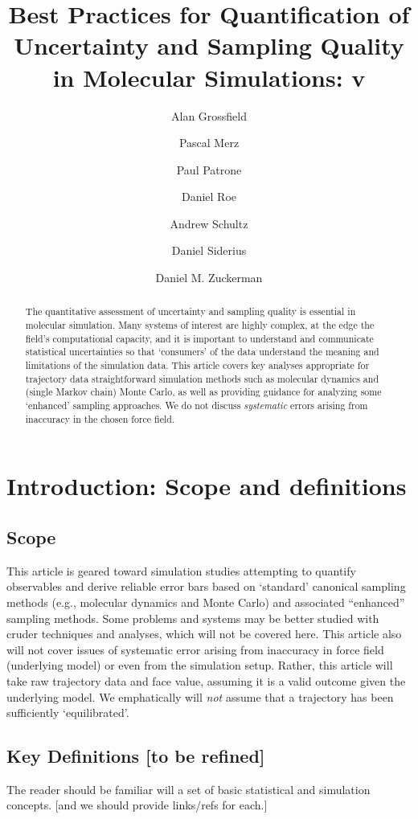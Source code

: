 \documentclass[9pt]{livecoms}
\title{Best Practices for Quantification of Uncertainty and Sampling Quality in Molecular Simulations: v\versionnumber}
\author[1*\authfn{1}]{Alan Grossfield}
\author[2*\authfn{1}]{Pascal Merz}
\author[3*\authfn{1}]{Paul Patrone}
\author[4*\authfn{1}]{Daniel Roe}
\author[5*\authfn{1}]{Andrew Schultz}
\author[6*\authfn{1}]{Daniel Siderius}
\author[7*\authfn{1}]{Daniel M. Zuckerman}
\affil[1]{Institution 1}
\affil[7]{Oregon Health \& Science University}
\begin{document}
\maketitle

\begin{abstract}
The quantitative assessment of uncertainty and sampling quality is essential in molecular simulation.
Many systems of interest are highly complex, at the edge the field's computational capacity, and it is important to understand and communicate statistical uncertainties so that `consumers' of the data understand the meaning and limitations of the simulation data.
This article covers key analyses appropriate for trajectory data straightforward simulation methods such as molecular dynamics and (single Markov chain) Monte Carlo, as well as providing guidance for analyzing some `enhanced' sampling approaches.
We do not discuss \emph{systematic} errors arising from inaccuracy in the chosen force field.
\end{abstract}

\section{Introduction: Scope and definitions}

\subsection{Scope}
This article is geared toward simulation studies attempting to quantify observables and derive reliable error bars based on `standard' canonical sampling methods (e.g., molecular dynamics and Monte Carlo) and associated “enhanced” sampling methods.  
Some problems and systems may be better studied with cruder techniques and analyses, which will not be covered here.
This article also will not cover issues of systematic error arising from inaccuracy in force field (underlying model) or even from the simulation setup.
Rather, this article will take raw trajectory data and face value, assuming it is a valid outcome given the underlying model.
We emphatically will \emph{not} assume that a trajectory has been sufficiently `equilibrated'.

\subsection{Key Definitions [to be refined]}
The reader should be familiar will a set of basic statistical and simulation concepts.
[and we should provide links/refs for each.]
\end{document}
